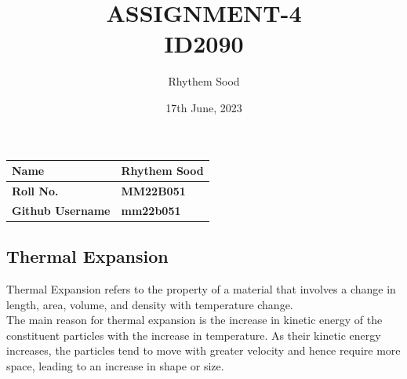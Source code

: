 \documentclass[12pt,a4paper]{article}
\title{\textbf{ASSIGNMENT-4 \\ ID2090}}
\author{Rhythem Sood}
\date{17th June, 2023}
\begin{document}
\maketitle

\begin{table}[H]
\centering
\setlength{\extrarowheight}{5pt}
\begin{tabular}{|p{6cm}|p{6cm}|}
\hline
\textbf{Name}          & \textbf{Rhythem Sood} \\ \hline
\textbf{Roll No.}      & \textbf{MM22B051}     \\ \hline
\textbf{Github Username} & \textbf{mm22b051}     \\ \hline
\end{tabular}
\end{table}

\begin{center}
   \section*{Thermal Expansion} 
\end{center}
Thermal Expansion refers to the property of a material that involves a change in length, area, volume, and density with temperature change.
\cite{wiki} \\ 
The main reason for thermal expansion is the increase in kinetic energy of the constituent particles with the increase in temperature. As their kinetic energy increases, the particles tend to move with greater velocity and hence require more space, leading to an increase in shape or size. 
\end{document}
